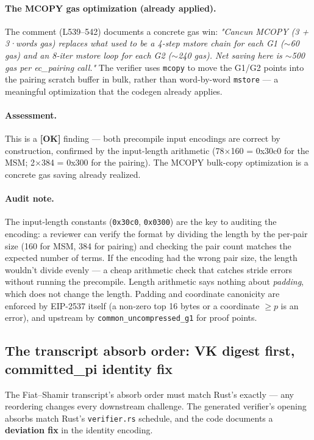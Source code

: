 \paragraph{The MCOPY gas optimization (already applied).} The
comment (L539--542) documents a concrete gas win: \emph{"Cancun
MCOPY (3 + 3·words gas) replaces what used to be a 4-step mstore
chain for each G1 ($\sim$60 gas) and an 8-iter mstore loop for
each G2 ($\sim$240 gas). Net saving here is $\sim$500 gas per
ec\_pairing call."} The verifier uses \texttt{mcopy} to move the
G1/G2 points into the pairing scratch buffer in bulk, rather than
word-by-word \texttt{mstore} --- a meaningful optimization that
the codegen already applies.

\paragraph{Assessment.} This is a
\textcolor{tracegreen}{\textbf{[OK]}} finding --- both precompile
input encodings are correct by construction, confirmed by the
input-length arithmetic (78$\times$160 = 0x30c0 for the MSM;
2$\times$384 = 0x300 for the pairing). The MCOPY bulk-copy
optimization is a concrete gas saving already realized.

\paragraph{Audit note.} The input-length constants
(\texttt{0x30c0}, \texttt{0x0300}) are the key to auditing the
encoding: a reviewer can verify the format by dividing the length
by the per-pair size (160 for MSM, 384 for pairing) and checking
the pair count matches the expected number of terms. If the
encoding had the wrong pair size, the length wouldn't divide evenly
--- a cheap arithmetic check that catches stride errors without
running the precompile.  Length arithmetic says
nothing about \emph{padding}, which does not change the length.
Padding and coordinate canonicity are enforced by EIP-2537 itself
(a non-zero top 16 bytes or a coordinate $\ge p$ is an error), and
upstream by \texttt{common\_\allowbreak{}uncompressed\_\allowbreak{}g1} for proof points.

\subsection{The transcript absorb order: VK digest first, committed\_pi identity fix}
\label{sec:pr-absorb-order}

The Fiat--Shamir transcript's absorb order must match Rust's
exactly --- any reordering changes every downstream challenge.
The generated verifier's opening absorbs match Rust's
\texttt{verifier.rs} schedule, and the code documents a
\textbf{deviation fix} in the identity encoding.

